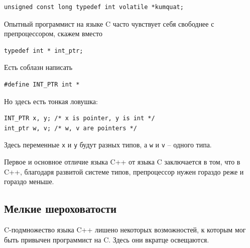 \documentclass[a4paper,12pt,oneside]{book}
\begin{document}
\begin{lstlisting}
unsigned const long typedef int volatile *kumquat;
\end{lstlisting}

Опытный программист на языке C часто чувствует себя свободнее с препроцессором, скажем вместо

\begin{lstlisting}
typedef int * int_ptr;
\end{lstlisting}

Есть соблазн написать

\begin{lstlisting}
#define INT_PTR int *
\end{lstlisting}

Но здесь есть тонкая ловушка:

\begin{lstlisting}
INT_PTR x, y; /* x is pointer, y is int */
int_ptr w, v; /* w, v are pointers */
\end{lstlisting}

Здесь переменные \lstinline!x! и \lstinline!y! будут разных типов, а \lstinline!w! и \lstinline!v! – одного типа.

Первое и основное отличие языка C++ от языка C заключается в том, что в C++, благодаря развитой системе типов, препроцессор нужен гораздо реже и гораздо меньше.

\subsection{Мелкие шероховатости}\label{LittleDivergences}

C-подмножество языка C++ лишено некоторых возможностей, к которым мог быть привычен программист на C. Здесь они вкратце освещаются.
\end{document}
